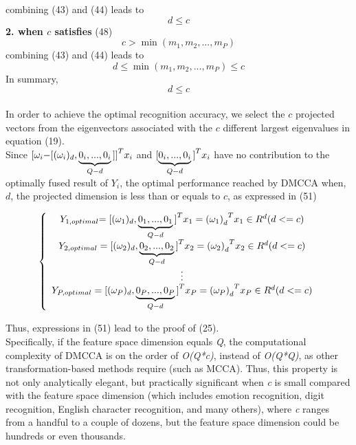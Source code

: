 \documentclass[journal]{IEEEtran}
\begin{document}
combining (43) and (44) leads to
\begin{equation}
d \le c
 \end{equation}
\textbf{2. when $c$ satisfies} (48)
\begin{equation}
c > \min ({m_1},{m_2},...,{m_P})
\end{equation}
combining (43) and (44) leads to
\begin{equation}
d \le \min ({m_1},{m_2},...,{m_P}) \le c
\end{equation}
In summary,
\begin{equation}
d \le c
\end{equation}\\\indent
In order to achieve the optimal recognition accuracy, we select the $c$ projected vectors from the eigenvectors associated with the $c$ different largest eigenvalues in equation (19).\\\indent
Since ${{\rm{[}}{\omega _i}{\rm{ - [(}}{\omega _i}{)_d},\underbrace {{0_i},...,{0_i}}_{Q - d}{\rm{]]}}^T}{x_i}$
 and ${[\underbrace {{0_i},...,{0_i}}_{Q - d}{\rm{]}}^T}{x_i}$
 have no contribution to the optimally fused result of $Y_i$, the optimal performance reached by DMCCA when, $d$, the projected dimension is less than or equals to $c$, as expressed in (51)
\begin{small}
\begin{equation}
\left\{ {\begin{array}{*{20}{c}}
   {{Y_{1,optimal}}{\rm{ = [(}}{\omega _1}{)_d},\underbrace {{0_1},...,{0_1}}_{Q - d}{{\rm{]}}^T}{x_1} = {{{\rm{(}}{\omega _1})}_d}^T{x_1} \in {R^d}(d <  = c)}  \\
   {{Y_{2,optimal}} = {{{\rm{[(}}{\omega _2}{)_d},\underbrace {{0_2},...,{0_2}}_{Q - d}{\rm{]}}}^T}{x_2} = {{{\rm{(}}{\omega _2})}_d}^T{x_2} \in {R^d}(d <  = c)}  \\
    \vdots   \\
   {{Y_{P,optimal}} = {{{\rm{[(}}{\omega _P}{)_d},\underbrace {{0_P},...,{0_P}}_{Q - d}{\rm{]}}}^T}{x_P} = {{{\rm{(}}{\omega _P})}_d}^T{x_P} \in {R^d}(d <  = c)}  \\
\end{array}} \right.
\end{equation}
\end{small}
Thus, expressions in (51) lead to the proof of (25).\\\indent Specifically, if the feature space dimension equals \emph{Q}, the computational complexity of DMCCA is on the order of \emph{O(Q*c)}, instead of \emph{O(Q*Q)}, as other transformation-based methods require (such as MCCA). Thus, this property is not only analytically elegant, but practically significant when \emph{c} is small compared with the feature space dimension (which includes emotion recognition, digit recognition, English character recognition, and many others), where \emph{c} ranges from a handful to a couple of dozens, but the feature space dimension could be hundreds or even thousands.\\\indent
\end{document}
